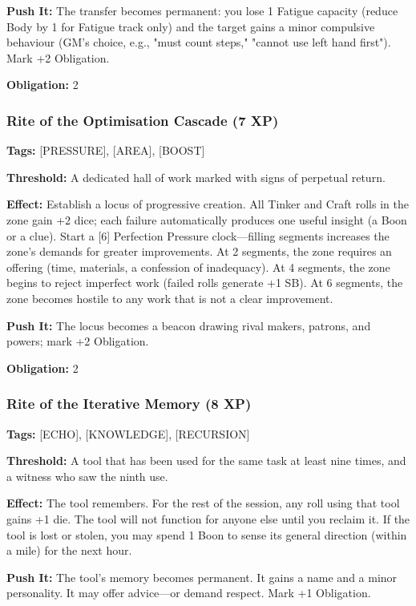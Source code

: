 \textbf{Push It:} The transfer becomes permanent: you lose 1 Fatigue capacity (reduce Body by 1 for Fatigue track only) and the target gains a minor compulsive behaviour (GM's choice, e.g., "must count steps," "cannot use left hand first"). Mark +2 Obligation.

\textbf{Obligation:} 2

\subsubsection{Rite of the Optimisation Cascade (7 XP)}

\textbf{Tags:} [PRESSURE], [AREA], [BOOST]

\textbf{Threshold:} A dedicated hall of work marked with signs of perpetual return.

\textbf{Effect:} Establish a locus of progressive creation. All Tinker and Craft rolls in the zone gain +2 dice; each failure automatically produces one useful insight (a Boon or a clue). Start a [6] Perfection Pressure clock—filling segments increases the zone's demands for greater improvements. At 2 segments, the zone requires an offering (time, materials, a confession of inadequacy). At 4 segments, the zone begins to reject imperfect work (failed rolls generate +1 SB). At 6 segments, the zone becomes hostile to any work that is not a clear improvement.

\textbf{Push It:} The locus becomes a beacon drawing rival makers, patrons, and powers; mark +2 Obligation.

\textbf{Obligation:} 2

\subsubsection{Rite of the Iterative Memory (8 XP)}

\textbf{Tags:} [ECHO], [KNOWLEDGE], [RECURSION]

\textbf{Threshold:} A tool that has been used for the same task at least nine times, and a witness who saw the ninth use.

\textbf{Effect:} The tool remembers. For the rest of the session, any roll using that tool gains +1 die. The tool will not function for anyone else until you reclaim it. If the tool is lost or stolen, you may spend 1 Boon to sense its general direction (within a mile) for the next hour.

\textbf{Push It:} The tool's memory becomes permanent. It gains a name and a minor personality. It may offer advice—or demand respect. Mark +1 Obligation.

